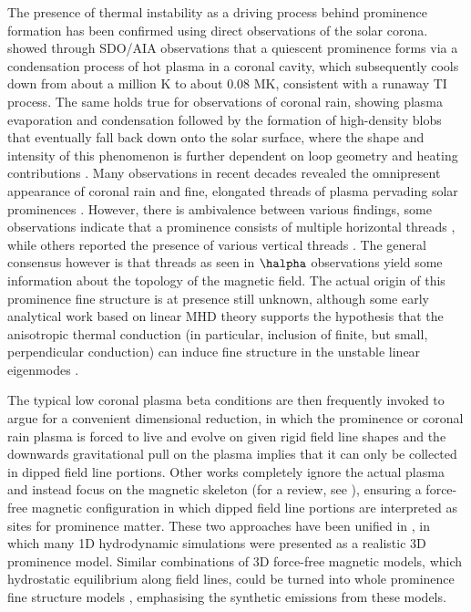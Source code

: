 The presence of thermal instability as a driving process behind prominence formation has been confirmed using direct observations of the solar corona. \citet{berger2012} showed through SDO/AIA observations that a quiescent prominence forms via a condensation process of hot plasma in a coronal cavity, which subsequently cools down from about a million K to about 0.08 MK, consistent with a runaway TI process. The same holds true for observations of coronal rain, showing plasma evaporation and condensation followed by the formation of high-density blobs that eventually fall back down onto the solar surface, where the shape and intensity of this phenomenon is further dependent on loop geometry and heating contributions \citep{auchere2018}. Many observations in recent decades revealed the omnipresent appearance of coronal rain \citep{kamio2011,antolin2015} and fine, elongated threads of plasma pervading solar prominences \citep{engvold1998,mackay2010}. However, there is ambivalence between various findings, some observations indicate that a prominence consists of multiple horizontal threads \citep{casini2003,okamoto2007}, while others reported the presence of various vertical threads \citep{berger2008}. The general consensus however is that threads as seen in $\halpha$ observations yield some information about the topology of the magnetic field. The actual origin of this prominence fine structure is at presence still unknown, although some early analytical work based on linear MHD theory supports the hypothesis that the anisotropic thermal conduction (in particular, inclusion of finite, but small, perpendicular conduction) can induce fine structure in the unstable linear eigenmodes \citep{vanderlinden1991}.

The typical low coronal plasma beta conditions are then frequently invoked to argue for a convenient dimensional reduction, in which the prominence or coronal rain plasma is forced to live and evolve on given rigid field line shapes and the downwards gravitational pull on the plasma implies that it can only be collected in dipped field line portions. Other works completely ignore the actual plasma and instead focus on the magnetic skeleton (for a review, see \citet{gibson2018}), ensuring a force-free magnetic configuration in which dipped field line portions are interpreted as sites for prominence matter. These two approaches have been unified in \citet{luna2012}, in which many 1D hydrodynamic simulations were presented as a realistic 3D prominence model. Similar combinations of 3D force-free magnetic models, which hydrostatic equilibrium along field lines, could be turned into whole prominence fine structure models \citep{gunar2015}, emphasising the synthetic emissions from these models.

